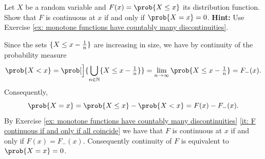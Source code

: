 \begin{exercise}
    Let \(X\) be a random variable and \(F(x) = \prob{X \le x}\) its
    distribution function. Show that \(F\) is continuous at \(x\) if and only if
    \(\prob{X = x} = 0\).
    \textbf{Hint:} Use Exercise \ref{ex: monotone functions have countably many discontinuities}.
    \begin{solution}
        Since the sets \(\{X \le x - \frac1n\}\) are increasing
        in size, we have by continuity of the probability measure
        \[
            \prob{X < x}
            = \prob[\Big]{\bigcup_{n\in \nat} \set{X \le x - \tfrac1n}}
            = \lim_{n\to\infty} \prob{X \le x - \tfrac1n}
            = F_-(x).
        \]
        Consequently,
        \[
            \prob{X = x} = \prob{X \le x} - \prob{X < x} = F(x) - F_-(x).
        \]
        By Exercise \ref{ex: monotone functions have countably many
        discontinuities} \ref{it: F continuous if and only if all coincide} we
        have that \(F\) is continuous at \(x\) if and only if \(F(x) = F_-(x)\).
        Consequently continuity of \(F\) is equivalent to \(\prob{X = x} = 0\).
    \end{solution}
\end{exercise}

